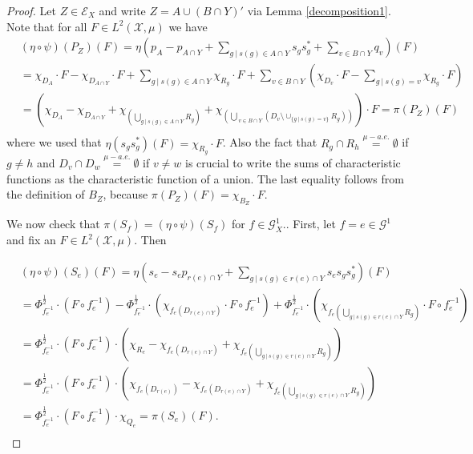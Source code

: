 \documentclass[12pt, reqno]{amsart}
\theoremstyle{definition}
\theoremstyle{remark}
\numberwithin{equation}{section}
\begin{document}
\begin{proof}
    Let $Z \in \mathcal{E}_X$ and write $Z = A \cup (B \cap Y)'$ via Lemma \ref{decomposition1}. Note that for all $F \in L^2(\mathcal{X}, \mu)$ we have
    \begin{align*}
        & (\eta \circ \psi)(P_Z)(F)  = \eta \left( p_A - p_{A \cap Y} + \sum\limits_{g \ | \ s(g) \in A \cap Y}s_g s_g^* + \sum\limits_{v \in B \cap Y}q_v \right)(F) \\
        & = \chi_{D_A} \cdot F - \chi_{D_{A \cap Y}} \cdot F + \sum\limits_{g \ | \ s(g) \in A \cap Y} \chi_{R_g} \cdot F +  \sum\limits_{v \in B \cap Y} \left(  \chi_{D_v} \cdot F - \sum\limits_{g \ | \ s(g) = v } \chi_{R_g} \cdot F \right)     \\      
        & = \left(  \chi_{D_{A}} - \chi_{D_{A \cap Y}} + \chi_{  \left(  \bigcup\limits_{g \ | \ s(g) \in A \cap Y}R_g  \right) }  +  \chi_{  \left(  \bigcup\limits_{\ v \in B \cap Y } ( D_v \setminus \cup_{ \{g \ | \ s(g) = v \} } R_g )  \right) } \right) \cdot F = \pi(P_Z)(F) \\
    \end{align*}
    where we used that $\eta(s_g s_g^*)(F) = \chi_{R_g} \cdot F$. Also the fact that $R_g \cap R_h  \stackrel{\mu-a.e.}{=}\emptyset$ if $g \neq h$ and $D_v \cap D_w  \stackrel{\mu-a.e.}{=}\emptyset$ if $v \neq w$ is crucial to write the sums of characteristic functions as the characteristic function of a union. The last equality follows from the definition of $B_Z$, because $\pi(P_Z)(F) = \chi_{B_Z} \cdot F$. 

    We now check that $\pi(S_f) = (\eta \circ \psi)(S_f)$ for $f \in \mathcal{G}_X^1$.. First, let  $f = e \in \mathcal{G}^1$ and fix an $F \in L^2(\mathcal{X}, \mu)$. Then  

    
   \begin{align*}
   & (\eta \circ \psi)(S_e)(F)  = \eta\left(s_e - s_ep_{r(e) \cap Y} + \sum\limits_{g \ | \ s(g) \in r(e) \cap Y}s_e s_g s_g^* \right)(F) \\
   & = \Phi_{f_e^{-1}}^{\frac{1}{2}} \cdot (F \circ f_e^{-1} ) - \Phi_{f_e^{-1}}^{\frac{1}{2}} \cdot \left( \chi_{f_e(D_{r(e) \cap Y})} \cdot F \circ f_e^{-1} \right)  + \Phi_{f_e^{-1}}^{\frac{1}{2}} \cdot \left( \chi_{ 
  f_e \left( \bigcup\limits_{ g \ | \ s(g) \in r(e) \cap Y} R_g  \right)  }      \cdot  F \circ f_e^{-1} \right) \\
  & = \Phi_{f_e^{-1}}^{\frac{1}{2}} \cdot (F \circ f_e^{-1} )  \cdot \left(  \chi_{R_e} - \chi_{f_e(D_{r(e) \cap Y})} +   \chi_{ 
  f_e \left( \bigcup\limits_{ g \ | \ s(g) \in r(e) \cap Y} R_g  \right)  }   \right) \\
  & = \Phi_{f_e^{-1}}^{\frac{1}{2}} \cdot (F \circ f_e^{-1} )  \cdot \left(  \chi_{f_e(D_{r(e)})} - \chi_{f_e(D_{r(e) \cap Y})} +   \chi_{ 
  f_e \left( \bigcup\limits_{ g \ | \ s(g) \in r(e) \cap Y} R_g  \right)  }   \right) \\
  & = \Phi_{f_e^{-1}}^{\frac{1}{2}} \cdot (F \circ f_e^{-1} )  \cdot  \chi_{Q_e} = \pi(S_e)(F).\\
\end{align*}


\end{proof}
\end{document}
